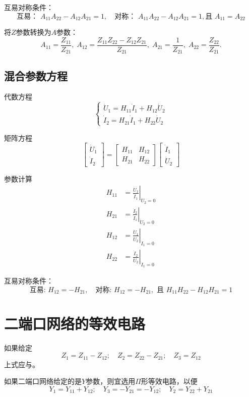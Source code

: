 互易对称条件：
\[
\text{互易： }A_{11}A_{22} - A_{12}A_{21} = 1,\quad
\text{对称： } A_{11}A_{22} - A_{12}A_{21} = 1 ,\text{且 } A_{11} = A_{22}
\]

将$Z$参数转换为$A$参数：
\[
A_{11}=\frac{Z_{11}}{Z_{21}},\;
A_{12}=\frac{Z_{11}Z_{22}-Z_{12}Z_{21}}{Z_{21}},\;
A_{21}=\frac{1}{Z_{21}},\;
A_{22}=\frac{Z_{22}}{Z_{21}}.
\]

\subsection{混合参数方程}
代数方程
\[
\begin{cases}
\dot{U}_1 = H_{11}\dot{I}_1 + H_{12}\dot{U}_2 \\
\dot{I}_2 = H_{21}\dot{I}_1 + H_{22}\dot{U}_2
\end{cases}
\]

矩阵方程
\[
\begin{bmatrix}
\dot{U}_1 \\
\dot{I}_2
\end{bmatrix}
=
\begin{bmatrix}
H_{11} & H_{12} \\
H_{21} & H_{22}
\end{bmatrix}
\begin{bmatrix}
\dot{I}_1 \\
\dot{U}_2
\end{bmatrix}
\]

参数计算
\[
\begin{align*}
H_{11} &= \left. \frac{\dot{U}_1}{\dot{I}_1} \right|_{\dot{U}_2 = 0} \\
H_{21} &= \left. \frac{\dot{I}_2}{\dot{I}_1} \right|_{\dot{U}_2 = 0} \\
H_{12} &= \left. \frac{\dot{U}_1}{\dot{U}_2} \right|_{\dot{I}_1 = 0}\\
H_{22} &= \left. \frac{\dot{I}_2}{\dot{U}_2} \right|_{\dot{I}_1 = 0}
\end{align*}
\]

互易对称条件：
\[
\text{互易: } H_{12} = -H_{21},\quad
\text{对称: } H_{12} = -H_{21},\text{ 且 } H_{11}H_{22} - H_{12}H_{21} = 1
\]

\section{二端口网络的等效电路}
如果给定
\[
Z_1=Z_{11}-Z_{12};\quad
Z_2=Z_{22}-Z_{21};\quad
Z_3=Z_{12}
\]
上式应与。

如果二端口网络给定的是$Y$参数，则宜选用$\varPi$形等效电路，以便
\[
Y_1=Y_{11}+Y_{12};\quad
Y_3=-Y_{21}=-Y_{12};\quad
Y_2=Y_{22}+Y_{21}
\]

